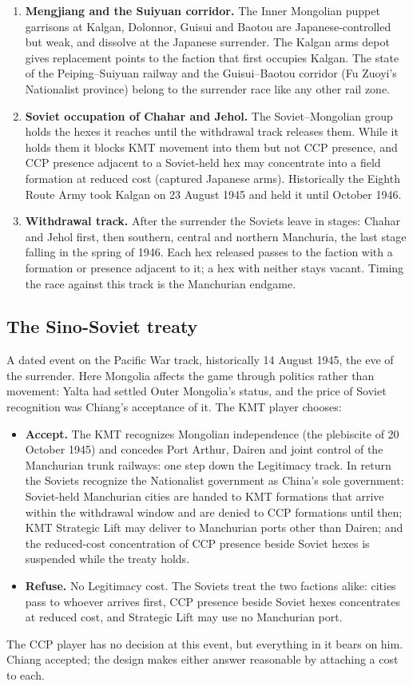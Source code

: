 \documentclass[11pt]{article}
\begin{document}
\begin{enumerate}
\item \textbf{Mengjiang and the Suiyuan corridor.} The Inner Mongolian puppet garrisons at Kalgan, Dolonnor, Guisui and Baotou are Japanese-controlled but weak, and dissolve at the Japanese surrender. The Kalgan arms depot gives replacement points to the faction that first occupies Kalgan. The state of the Peiping--Suiyuan railway and the Guisui--Baotou corridor (Fu Zuoyi's Nationalist province) belong to the surrender race like any other rail zone.
\item \textbf{Soviet occupation of Chahar and Jehol.} The Soviet--Mongolian group holds the hexes it reaches until the withdrawal track releases them. While it holds them it blocks KMT movement into them but not CCP presence, and CCP presence adjacent to a Soviet-held hex may concentrate into a field formation at reduced cost (captured Japanese arms). Historically the Eighth Route Army took Kalgan on 23 August 1945 and held it until October 1946.
\item \textbf{Withdrawal track.} After the surrender the Soviets leave in stages: Chahar and Jehol first, then southern, central and northern Manchuria, the last stage falling in the spring of 1946. Each hex released passes to the faction with a formation or presence adjacent to it; a hex with neither stays vacant. Timing the race against this track is the Manchurian endgame.
\end{enumerate}

\subsection{The Sino-Soviet treaty}
A dated event on the Pacific War track, historically 14 August 1945, the eve of the surrender. Here Mongolia affects the game through politics rather than movement: Yalta had settled Outer Mongolia's status, and the price of Soviet recognition was Chiang's acceptance of it. The KMT player chooses:
\begin{itemize}
\item \textbf{Accept.} The KMT recognizes Mongolian independence (the plebiscite of 20 October 1945) and concedes Port Arthur, Dairen and joint control of the Manchurian trunk railways: one step down the Legitimacy track. In return the Soviets recognize the Nationalist government as China's sole government: Soviet-held Manchurian cities are handed to KMT formations that arrive within the withdrawal window and are denied to CCP formations until then; KMT Strategic Lift may deliver to Manchurian ports other than Dairen; and the reduced-cost concentration of CCP presence beside Soviet hexes is suspended while the treaty holds.
\item \textbf{Refuse.} No Legitimacy cost. The Soviets treat the two factions alike: cities pass to whoever arrives first, CCP presence beside Soviet hexes concentrates at reduced cost, and Strategic Lift may use no Manchurian port.
\end{itemize}
The CCP player has no decision at this event, but everything in it bears on him. Chiang accepted; the design makes either answer reasonable by attaching a cost to each.
\end{document}
